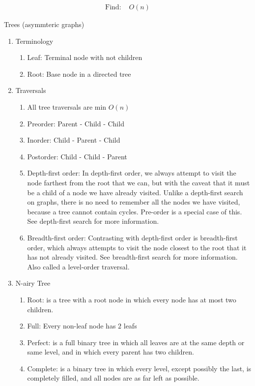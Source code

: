 \documentclass[12pt]{article}
\renewcommand{\=}[1]{\stackrel{#1}{=}} %
\theoremstyle{definition}
\theoremstyle{remark}
\begin{document}
\begin{enumerate}
\begin{enumerate}
\begin{align*}
        \textrm{Find: } & O(n)
      \end{align*}
    \end{enumerate}
    Trees (asymmteric graphs)
    \begin{enumerate}
    \item Terminology
      \begin{enumerate}
      \item Leaf: Terminal node with not children
      \item Root: Base node in a directed tree
      \end{enumerate}
    \item Traversals
      \begin{enumerate}
      \item All tree traversals are min $O(n)$
      \item Preorder: Parent - Child - Child
      \item Inorder: Child - Parent - Child
      \item Postorder: Child - Child - Parent
      \item Depth-first order:
        In depth-first order, we always attempt to visit the node farthest from the root that we can, but with the caveat that it must be a child of a node we have already visited. Unlike a depth-first search on graphs, there is no need to remember all the nodes we have visited, because a tree cannot contain cycles. Pre-order is a special case of this. See depth-first search for more information.
      \item Breadth-first order:
Contrasting with depth-first order is breadth-first order, which always attempts to visit the node closest to the root that it has not already visited. See breadth-first search for more information. Also called a level-order traversal.
      \end{enumerate}
    \item N-airy Tree
      \begin{enumerate}
      \item Root: is a tree with a root node in which every node has at most two children.
      \item Full: Every non-leaf node has $2$ leafs 
      \item Perfect: is a full binary tree in which all leaves are at the same depth or same level, and in which every parent has two children.
      \item Complete: is a binary tree in which every level, except possibly the last, is completely filled, and all nodes are as far left as possible.

\end{enumerate}
\end{enumerate}
\end{enumerate}
\end{document}
